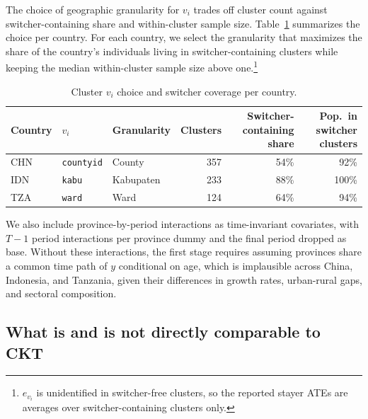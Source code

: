 The choice of geographic granularity for $v_i$ trades off cluster count against switcher-containing share and within-cluster sample size.
Table~\ref{tab:vv-rob-clusters} summarizes the choice per country.
For each country, we select the granularity that maximizes the share of the country's individuals living in switcher-containing clusters while keeping the median within-cluster sample size above one.\footnote{$e_{v_i}$ is unidentified in switcher-free clusters, so the reported stayer ATEs are averages over switcher-containing clusters only.}

\begin{table}[h]
\centering
\small
\caption{Cluster $v_i$ choice and switcher coverage per country.}
\label{tab:vv-rob-clusters}
\begin{tabular}{lllrrr}
\hline\hline
Country & $v_i$ & Granularity & Clusters & Switcher-containing share & Pop.\ in switcher clusters \\
\hline
CHN & \texttt{countyid} & County & 357 & 54\% & 92\% \\
IDN & \texttt{kabu} & Kabupaten & 233 & 88\% & 100\% \\
TZA & \texttt{ward} & Ward & 124 & 64\% & 94\% \\
\hline\hline
\end{tabular}
\end{table}

We also include province-by-period interactions as time-invariant covariates, with $T-1$ period interactions per province dummy and the final period dropped as base.
Without these interactions, the first stage requires assuming provinces share a common time path of $y$ conditional on age, which is implausible across China, Indonesia, and Tanzania, given their differences in growth rates, urban-rural gaps, and sectoral composition.

\subsection{What is and is not directly comparable to CKT}\label{app:vv-rob-comparable}

